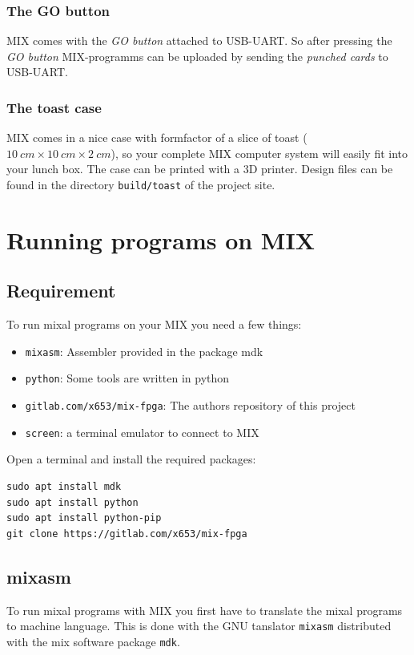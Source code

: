 \documentclass[a4paper,ngerman]{scrartcl}
\begin{document}
\subsubsection{The GO button}
MIX comes with the \textit{GO button} attached to USB-UART. So after pressing the \textit{GO button} MIX-programms can be uploaded by sending the \textit{punched cards} to USB-UART.

\subsubsection{The toast case}
MIX comes in a nice case with formfactor of a slice of toast ($\SI{10}{cm} \times \SI{10}{cm} \times \SI{2}{cm}$), so your complete MIX computer system will easily fit into your lunch box. The case can be printed with a 3D printer. Design files can be found in the directory \lstinline|build/toast| of the project site.

\section{Running programs on MIX}
\subsection{Requirement}
To run mixal programs on your MIX you need a few things:
\begin{itemize}
	\item \lstinline|mixasm|: Assembler provided in the package mdk
	\item \lstinline|python|: Some tools are written in python
	\item \lstinline|gitlab.com/x653/mix-fpga|: The authors repository of this project
	\item \lstinline|screen|: a terminal emulator to connect to MIX
\end{itemize}

Open a terminal and install the required packages:

\begin{lstlisting}[numbers=none,frame=none]
sudo apt install mdk
sudo apt install python
sudo apt install python-pip
git clone https://gitlab.com/x653/mix-fpga
\end{lstlisting}

\subsection{mixasm}
To run mixal programs with MIX you first have to translate the mixal programs to machine language. This is done with the GNU tanslator \lstinline|mixasm| distributed with the mix software package  \lstinline|mdk|.
\end{document}
